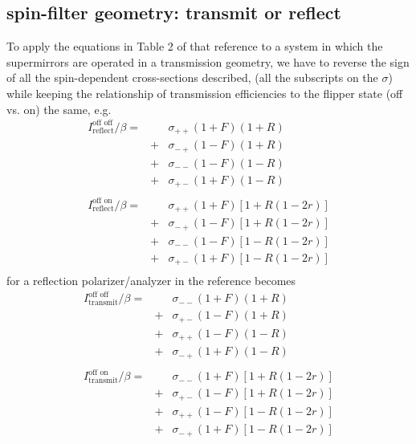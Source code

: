 \documentclass[12pt,letterpaper]{article}
\begin{document}
\subsection{spin-filter geometry: transmit or reflect}
To apply the equations in Table 2 of that reference to a system in which the supermirrors are
operated in a transmission geometry, we have to reverse the sign of all the spin-dependent cross-sections described,
(all the subscripts on the $\sigma$) while keeping the relationship of transmission efficiencies to the flipper state
(off vs. on) the same, e.g.
\begin{equation}
\begin{array}{rll}
	I^{\textrm{off off}}_\textrm{reflect} / \beta =& {} & \sigma_{++} (1 + F)(1 + R) \\
	 {} & + & \sigma_{-+} (1 - F)(1 + R) \\
	 {} & + & \sigma_{--} (1 - F)(1 - R) \\
	 {} & + & \sigma_{+-} (1 + F)(1 - R) \\
	 {} & {} & {} \\
	 I^{\textrm{off on}}_\textrm{reflect} / \beta =& {} & \sigma_{++} (1 + F)[1 + R(1-2r)] \\
	 {} & + & \sigma_{-+} (1 - F)[1 + R(1-2r)] \\
	 {} & + & \sigma_{--} (1 - F)[1 - R(1-2r)] \\
	 {} & + & \sigma_{+-} (1 + F)[1 - R(1-2r)] \\
\end{array}
\end{equation}
for a reflection polarizer/analyzer in the reference becomes
\begin{equation}
\begin{array}{rll}
	I^{\textrm{off off}}_\textrm{transmit} / \beta =& {} & \sigma_{--} (1 + F)(1 + R) \\
	 {} & + & \sigma_{+-} (1 - F)(1 + R) \\
	 {} & + & \sigma_{++} (1 - F)(1 - R) \\
	 {} & + & \sigma_{-+} (1 + F)(1 - R) \\
	 {} & {} & {} \\
	 I^{\textrm{off on}}_\textrm{transmit} / \beta =& {} & \sigma_{--} (1 + F)[1 + R(1-2r)] \\
	 {} & + & \sigma_{+-} (1 - F)[1 + R(1-2r)] \\
	 {} & + & \sigma_{++} (1 - F)[1 - R(1-2r)] \\
	 {} & + & \sigma_{-+} (1 + F)[1 - R(1-2r)] \\
\end{array}
\end{equation}
\end{document}

